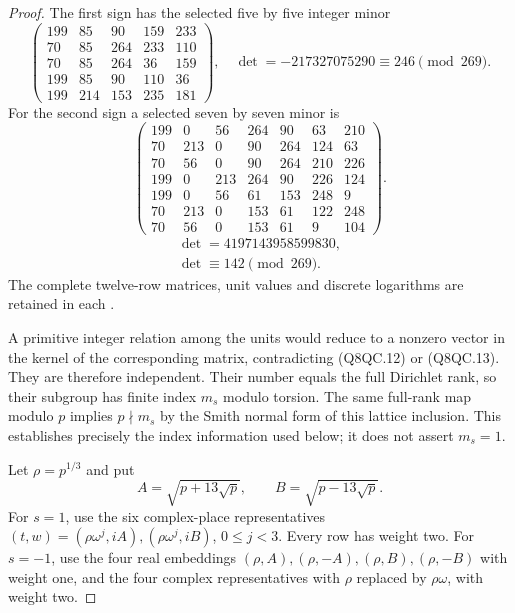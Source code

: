 \begin{proof}
The first sign has the selected five by five integer minor
\[
 \begin{pmatrix}
199&85&90&159&233\\
70&85&264&233&110\\
70&85&264&36&159\\
199&85&90&110&36\\
199&214&153&235&181
 \end{pmatrix},
 \quad
 \det=-217327075290\equiv246\pmod{269}.
 \tag{Q8QC.12}
\]
For the second sign a selected seven by seven minor is
\[
 \begin{pmatrix}
199&0&56&264&90&63&210\\
70&213&0&90&264&124&63\\
70&56&0&90&264&210&226\\
199&0&213&264&90&226&124\\
199&0&56&61&153&248&9\\
70&213&0&153&61&122&248\\
70&56&0&153&61&9&104
 \end{pmatrix}.
 \tag{Q8QC.13a}
\]
\[
 \begin{gathered}
 \det=4197143958599830,\\
 \det\equiv142\pmod{269}.
 \end{gathered}
 \tag{Q8QC.13}
\]
The complete twelve-row matrices, unit values and discrete
logarithms are retained in each
.

A primitive integer relation among the units would reduce to
a nonzero vector in the kernel of the corresponding matrix,
contradicting (Q8QC.12) or (Q8QC.13).
They are therefore independent.
Their number equals the full Dirichlet rank, so their subgroup
has finite index $m_s$ modulo torsion.
The same full-rank map modulo $p$ implies $p\nmid m_s$ by the
Smith normal form of this lattice inclusion.
This establishes precisely the index information used below;
it does not assert $m_s=1$.

Let $\rho=p^{1/3}$ and put
\[
             A=\sqrt{p+13\sqrt p},\qquad
             B=\sqrt{p-13\sqrt p}.
 \tag{Q8QC.14}
\]
For $s=1$, use the six complex-place representatives
$(t,w)=(\rho\omega^j,iA),(\rho\omega^j,iB)$, $0\leq j<3$.
Every row has weight two.
For $s=-1$, use the four real embeddings
$(\rho,A),(\rho,-A),(\rho,B),(\rho,-B)$ with weight one,
and the four complex representatives with $\rho$ replaced by
$\rho\omega$, with weight two.


\end{proof}
